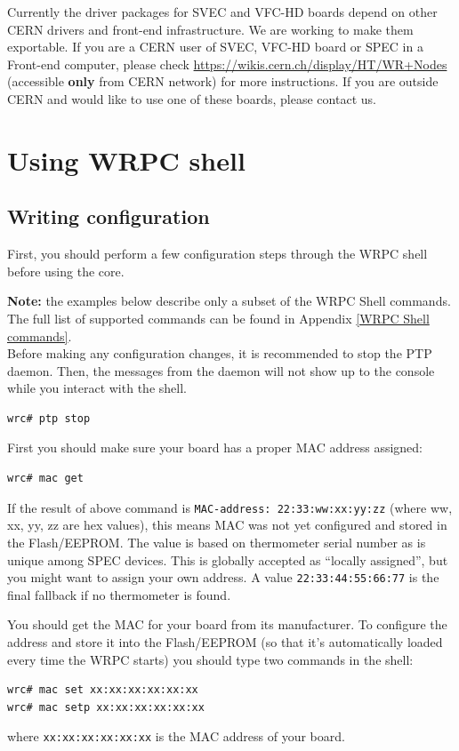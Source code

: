 \documentclass[a4paper, 12pt]{article}
\renewcommand{\_}{\underscore\allowbreak}
\begin{document}
Currently the driver packages for SVEC and VFC-HD boards depend on other CERN
drivers and front-end infrastructure. We are working to make them exportable. If
you are a CERN user of SVEC, VFC-HD board or SPEC in a Front-end computer,
please check
\url{https://wikis.cern.ch/display/HT/WR+Nodes} (accessible \textbf{only} from
CERN network) for more instructions. If you are outside CERN and would like to
use one of these boards, please contact us.

\newpage
\section{Using WRPC shell}

\subsection{Writing configuration}
\label{Writing configuration}

First, you should perform a few configuration steps through the WRPC shell
before using the core.

\noindent\textbf{Note:} the examples below describe only a subset of the WRPC
Shell commands. The full list of supported commands can be found in Appendix
\ref{WRPC Shell commands}.\\

Before making any configuration changes, it is recommended to stop the
PTP daemon.  Then, the messages from the daemon will not show up to the
console while you interact with the shell.

\begin{lstlisting}
wrc# ptp stop
\end{lstlisting}

\noindent First you should make sure your board has a proper MAC address
assigned:
\begin{lstlisting}
wrc# mac get
\end{lstlisting}
If the result of above command is \texttt{MAC-address: 22:33:ww:xx:yy:zz} (where
ww, xx, yy, zz are hex values), this
means MAC was not yet configured and stored in the Flash/EEPROM. The value is
based on thermometer serial number as is unique among SPEC devices. This is
globally accepted as ``locally assigned'', but you might want to assign your own
address. A value \texttt{22:33:44:55:66:77} is the final fallback if no
thermometer is found.

You should get the MAC for your board from its manufacturer. To configure the
address and store it into the Flash/EEPROM (so that it's automatically loaded
every time the WRPC starts) you should type two commands in the shell:
\begin{lstlisting}
wrc# mac set xx:xx:xx:xx:xx:xx
wrc# mac setp xx:xx:xx:xx:xx:xx
\end{lstlisting}
where \texttt{xx:xx:xx:xx:xx:xx} is the MAC address of your board.\\
\end{document}
